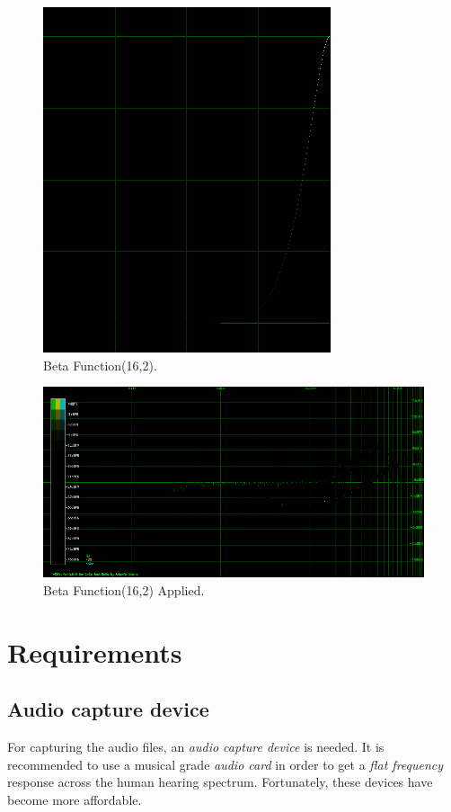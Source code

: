 \documentclass[10pt,a4paper]{report}
\begin{document}
\begin{appendices}
\begin{figure}[H]
	\centering
	\includegraphics[width=0.4\linewidth]{images/colorfilter/BetaFunctionPlot_5.png}
	\caption[Beta Function(16,2)]{Beta Function(16,2).}
	\label{fig:betafunctionplot5}
\end{figure}

\begin{figure}[H]
	\centering
	\includegraphics[width=1\linewidth]{images/colorfilter/BetaFunctionPlot_5_Data.png}
	\caption[Beta Function(16,2)]{Beta Function(16,2) Applied.}
	\label{fig:betafunctionplot5data}
\end{figure}

\chapter{Requirements}
\label{requirements}
\section{Audio capture device}
\label{audiocards}
For capturing the audio files, an \textit{audio capture device} is needed. It is recommended to use a musical grade \textit{audio card} in order to get a \textit{flat frequency} response across the human hearing spectrum. Fortunately, these devices have become more affordable.


\end{appendices}
\end{document}
